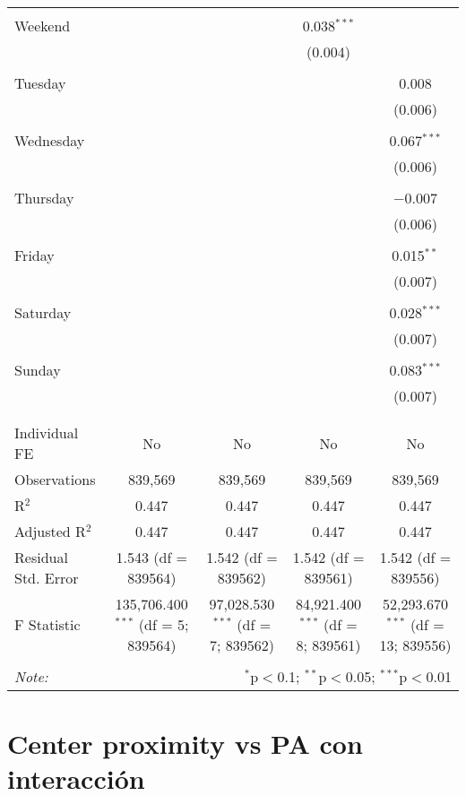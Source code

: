 \documentclass[
]{article}
\begin{document}
\begin{table}[!htbp]
{\begin{tabular}{@{\extracolsep{5pt}}lcccc}
  & & & & \\ 
 Weekend &  &  & 0.038$^{***}$ &  \\ 
  &  &  & (0.004) &  \\ 
  & & & & \\ 
 Tuesday &  &  &  & 0.008 \\ 
  &  &  &  & (0.006) \\ 
  & & & & \\ 
 Wednesday &  &  &  & 0.067$^{***}$ \\ 
  &  &  &  & (0.006) \\ 
  & & & & \\ 
 Thursday &  &  &  & $-$0.007 \\ 
  &  &  &  & (0.006) \\ 
  & & & & \\ 
 Friday &  &  &  & 0.015$^{**}$ \\ 
  &  &  &  & (0.007) \\ 
  & & & & \\ 
 Saturday &  &  &  & 0.028$^{***}$ \\ 
  &  &  &  & (0.007) \\ 
  & & & & \\ 
 Sunday &  &  &  & 0.083$^{***}$ \\ 
  &  &  &  & (0.007) \\ 
  & & & & \\ 
\hline \\[-1.8ex] 
Individual FE & No & No & No & No \\ 
Observations & 839,569 & 839,569 & 839,569 & 839,569 \\ 
R$^{2}$ & 0.447 & 0.447 & 0.447 & 0.447 \\ 
Adjusted R$^{2}$ & 0.447 & 0.447 & 0.447 & 0.447 \\ 
Residual Std. Error & 1.543 (df = 839564) & 1.542 (df = 839562) & 1.542 (df = 839561) & 1.542 (df = 839556) \\ 
F Statistic & 135,706.400$^{***}$ (df = 5; 839564) & 97,028.530$^{***}$ (df = 7; 839562) & 84,921.400$^{***}$ (df = 8; 839561) & 52,293.670$^{***}$ (df = 13; 839556) \\ 
\hline 
\hline \\[-1.8ex] 
\textit{Note:}  & \multicolumn{4}{r}{$^{*}$p$<$0.1; $^{**}$p$<$0.05; $^{***}$p$<$0.01} \\ 
\end{tabular}
} 
\end{table} 
\newpage
\section{Center proximity vs PA con interacción}
\end{document}
